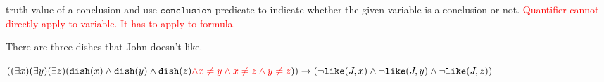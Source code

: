 \begin{QandA}
\begin{answered}
{         truth value of a conclusion and use $\texttt{conclusion}$ predicate to indicate whether the given variable is a conclusion or not.
         \textcolor{red}{Quantifier cannot directly apply to variable. It has to apply to formula.}}
         \end{answered}
   \item There are three dishes that John doesn’t like.
         \begin{answered}
         $((\exists x)(\exists y)(\exists z)(\texttt{dish}(x) \land \texttt{dish}(y) \land \texttt{dish}(z) \textcolor{red}{\land 
         x \ne y \land x \ne z \land y \ne z})) \rightarrow (
         \neg \texttt{like}(J,x) \land \neg \texttt{like}(J,y) \land \neg \texttt{like}(J,z))$
         \end{answered}
\end{QandA}